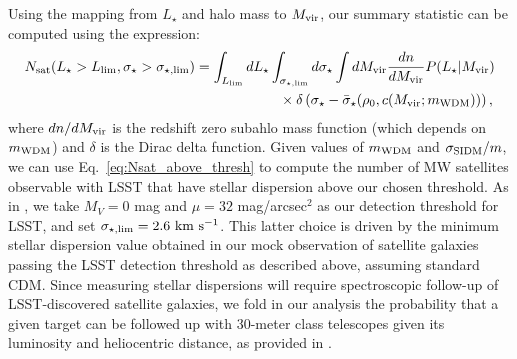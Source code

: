 Using the mapping from $L_\star$ and halo mass to $M_{\rm vir}$, our summary statistic can be computed using the expression:
\begin{align}\label{eq:Nsat_above_thresh}
 N_{\rm sat}(L_\star>L_{\rm lim}, \sigma_\star> \sigma_{\star,\rm lim}) &=  \int_{L_{\rm lim}} dL_\star \int_{\sigma_{\star,\rm lim}} d\sigma_\star \int dM_{\rm vir} \frac{dn}{d M_{\rm vir}} P(L_\star|M_{\rm vir}) \\ \nonumber
 &\qquad\qquad \qquad \times \delta\left(\sigma_\star-\bar{\sigma}_\star(\rho_0,c(M_{\rm vir};m_{\rm WDM}))\right),
\end{align}
where $dn/dM_{\rm vir}$ is the redshift zero subahlo mass function (which depends on $m_{\rm WDM}$) and $\delta$ is the Dirac delta function. Given values of $m_{\rm WDM}$ and $\sigma_{\rm SIDM}/m$, we can use Eq.~\eqref{eq:Nsat_above_thresh} to compute the number of MW satellites observable with LSST that have stellar dispersion above our chosen threshold. As in ,
we take $M_V=0$ mag and $\mu=32$ mag/arcsec$^2$ as our detection threshold for LSST, and set $\sigma_{\star,\rm lim}=2.6 \mathrm{\,\mathrm{\,km}\,\mathrm{\,s}^{-1}}$. This latter choice is driven by the minimum stellar dispersion value obtained in our mock observation of satellite galaxies passing the LSST detection threshold as described above, assuming standard CDM. Since measuring stellar dispersions will require spectroscopic follow-up of LSST-discovered satellite galaxies, we fold in our analysis the probability that a given target can be followed up with 30-meter class telescopes given its luminosity and heliocentric distance, as provided in .

